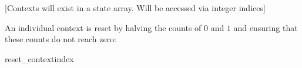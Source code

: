 \label{arithcontexts}

[Contexts will exist in a state array. Will be accessed via integer indices]


An individual context is reset by halving the counts of $0$ and $1$ and ensuring that
these counts do not reach zero:

\begin{pseudo}{reset\_context}{index}
\end{pseudo}

\begin{comment}
The decoder shall maintain the statistics relating to the set of
contexts that may be used in decoding a data element. How these shall be
initialised is set out in Sections  and . A context is modelled as
consisting of the following unsigned integer values, which constitute
its state:

COUNT0

COUNT1

COUNT0 represents a count of the number of zeroes that have occurred in
the context, COUNT1 a count of the number of ones that have occurred in
the context. 

From these values WEIGHT, SCALED\_COUNT0 and SCALED\_COUNT1 are derived.
WEIGHT shall always be equal to COUNT0+COUNT1. WEIGHT shall always be
less than 1024

SCALED\_COUNT0 is a count of zeroes scaled to a total count of 1024.
SCALED\_COUNT1 is a count of ones, likewise scaled to a total count of
1024. The derivation of the scaled counts is specified in Section .
\end{comment}
